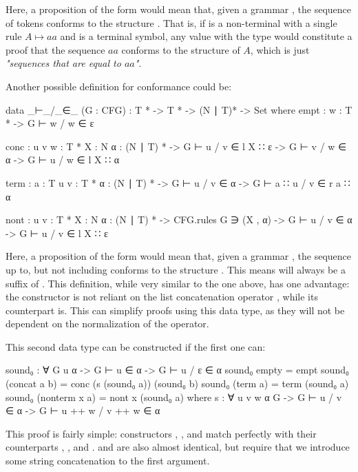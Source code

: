 	Here, a proposition of the form  would mean that, given a
	grammar , the sequence of tokens  conforms to the
	structure . That is, if  is a non-terminal with a
	single rule $A \mapsto aa$ and  is a terminal symbol, any value
	with the type  would constitute a proof
	that the sequence $aa$ conforms to the structure of $A$, which is just
	\emph{"sequences that are equal to $aa$"}.

	Another possible definition for conformance could be:

	\begin{code}
		data _⊢_/_∈_ (G : CFG) : T * -> T * -> (N ∣ T)* -> Set where
		  empt : {w : T *} ->
		    G ⊢ w / w ∈ ε

		  conc : {u v w : T *} {X : N} {α : (N ∣ T) *} ->
		    G ⊢ u / v ∈ l X ∷ ε ->
		    G ⊢ v / w ∈ α ->
		      G ⊢ u / w ∈ l X ∷ α

		  term : {a : T} {u v : T *} {α : (N ∣ T) *} ->
		    G ⊢ u / v ∈ α ->
		      G ⊢ a ∷ u / v ∈ r a ∷ α

		  nont : {u v : T *} {X : N} {α : (N ∣ T) *} ->
		    CFG.rules G ∋ (X , α) ->
		    G ⊢ u / v ∈ α ->
		    G ⊢ u / v ∈ l X ∷ ε
	\end{code}

	Here, a proposition of the form  would mean that,
	given a grammar , the sequence  up to, but not
	including  conforms to the structure . This means
	 will always be a suffix of . This definition, while
	very similar to the one above, has one advantage: the constructor
	 is not reliant on the list concatenation operator
	\codett{++}, while its counterpart  is. This can simplify
	proofs using this data type, as they will not be dependent on the
	normalization of the \codett{++} operator.

	This second data type can be constructed if the first one can:

	\begin{code}
		sound₀ :  ∀ {G u α} ->
		  G ⊢ u ∈ α ->
		  G ⊢ u / ε ∈ α
		sound₀ empty = empt
		sound₀ (concat a b) = conc (s (sound₀ a)) (sound₀ b)
		sound₀ (term a) = term (sound₀ a)
		sound₀ (nonterm x a) = nont x (sound₀ a)
		  where
		    s : ∀ {u v w α G} -> G ⊢ u / v ∈ α -> G ⊢ u ++ w / v ++ w ∈ α
	\end{code}

	This proof is fairly simple: constructors , ,
	and  match perfectly with their counterparts ,
	, and .  and  are
	also almost identical, but require that we introduce some string
	concatenation to the first argument.

